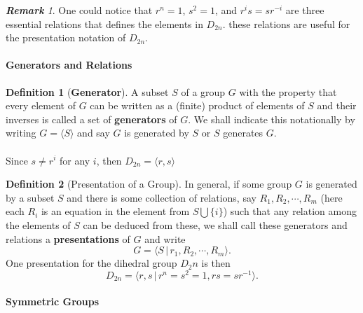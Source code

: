 \documentclass[paper=a4, fontsize=11pt]{scrartcl}
\numberwithin{equation}{section}		%
\numberwithin{figure}{section}			%
\numberwithin{table}{section}				%
\theoremstyle{definition}
\newtheorem{definition}{Definition}[section]
\theoremstyle{remark}
\newtheorem*{remark}{\textbf{Remark}}
\theoremstyle{example}
\begin{document}
\begin{remark}
    One could notice that $r^n = 1$, $s^2 = 1$, and $r^is = sr^{-i}$ are three essential relations that defines the elements in $D_{2n}$. these relations are useful for the presentation notation of $D_{2n}$.
\end{remark}

\paragraph{Generators and Relations}

\begin{definition}[\textbf{Generator}]
    A subset $S$ of a group $G$ with the property that every element of $G$ can be written as a (finite) product of elements of $S$ and their inverses is called a set of \textbf{generators} of $G$. We shall indicate this notationally by writing $G = \langle S \rangle$ and say $G$ is generated by $S$ or $S$ generates $G$.
\end{definition}

\paragraph{}

Since $s \neq r^i$ for any $i$, then $D_{2n} = \langle r, s \rangle$

\begin{definition}[Presentation of a Group]
    In general, if some group $G$ is generated by a subset $S$ and there is some collection of relations, say $R_1,R_2, \cdots, R_m$ (here each $R_i$ is an equation in the element from $S \bigcup \{i\}$) such that any relation among the elements of $S$ can be deduced from these, we shall call these generators and relations a \textbf{presentations} of $G$ and write
    \begin{equation}
        G = \langle S \,\lvert\, r_1,R_2,\cdots,R_m \rangle.
    \end{equation}
    One presentation for the dihedral group $D_2n$ is then
    \begin{equation}
        D_{2n} = \langle r,s \,\lvert\, r^n = s^2 = 1, rs = sr^{-1} \rangle.
    \end{equation}
\end{definition}

\paragraph{Symmetric Groups}




\newpage
\printbibliography
\end{document}
